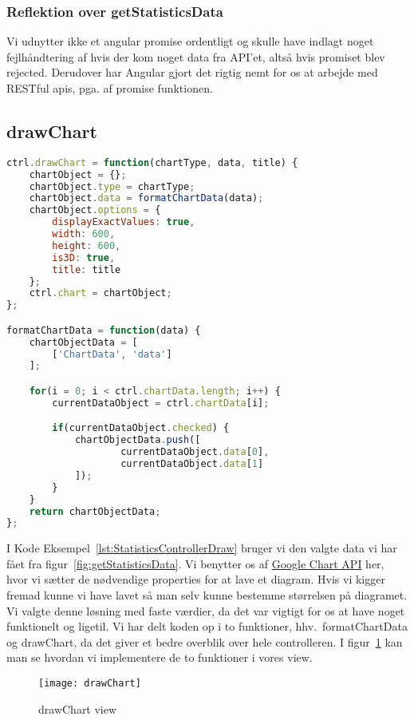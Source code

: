 \subsubsection{Reflektion over getStatisticsData}
Vi udnytter ikke et angular promise ordentligt og skulle have indlagt noget fejlhåndtering af hvis der kom noget data fra API'et,
altså hvis promiset blev rejected.
Derudover har Angular gjort det rigtig nemt for os at arbejde med RESTful apis, pga. af promise funktionen.
\subsection{drawChart}
\begin{lstlisting}[caption={drawChart}, language={JavaScript}, label={lst:StatisticsControllerDraw}]
ctrl.drawChart = function(chartType, data, title) {
    chartObject = {};
    chartObject.type = chartType;
    chartObject.data = formatChartData(data);
    chartObject.options = {
        displayExactValues: true,
        width: 600,
        height: 600,
        is3D: true,
        title: title
    };
    ctrl.chart = chartObject;
};

formatChartData = function(data) {
    chartObjectData = [
        ['ChartData', 'data']
    ];

    for(i = 0; i < ctrl.chartData.length; i++) {
        currentDataObject = ctrl.chartData[i];

        if(currentDataObject.checked) {
            chartObjectData.push([
                    currentDataObject.data[0],
                    currentDataObject.data[1]
            ]);
        }
    }
    return chartObjectData;
};
\end{lstlisting}
I Kode Eksempel~\ref{lst:StatisticsControllerDraw} bruger vi den valgte data vi har fået fra figur~\ref{fig:getStatisticsData}.
Vi benytter os af \hyperlink{GoogleChartAPI}{Google Chart API} her, hvor vi sætter de nødvendige properties for at lave et diagram.
Hvis vi kigger fremad kunne vi have lavet så man selv kunne bestemme størrelsen på diagramet. Vi valgte denne løsning med faste værdier, da det var vigtigt for os at have noget funktionelt
og ligetil.
Vi har delt koden op i to funktioner, hhv.\ formatChartData og drawChart, da det giver et bedre overblik over hele controlleren.
I figur~\ref{fig:drawChart} kan man se hvordan vi implementere de to funktioner i vores view.
\begin{figure}[H]
\centering
\texttt{[image: drawChart]}
\caption{drawChart view}
\label{fig:drawChart}
\end{figure}
